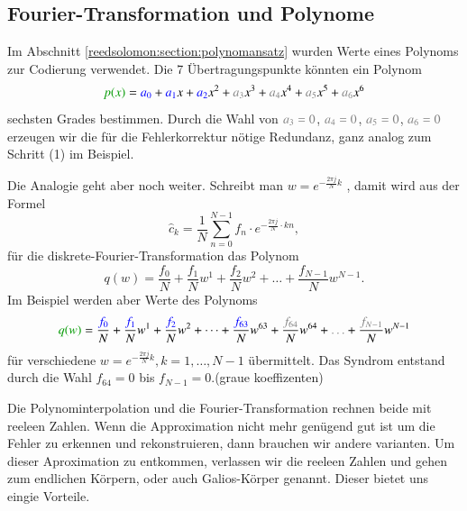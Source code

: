 \subsection{Fourier-Transformation und Polynome\label{reedsolomon:subsection:ftandpolynom}}
Im Abschnitt \ref{reedsolomon:section:polynomansatz}
wurden Werte eines Polynoms zur Codierung verwendet.
Die 7 Übertragungspunkte könnten ein Polynom
\begin{equation}
	\textcolor{darkgreen}{p(x)}
	=
	\textcolor{blue}{a_0} + \textcolor{blue}{a_1}x + \textcolor{blue}{a_2}x^2 +
	\textcolor{gray}{a_3}x^3 + \textcolor{gray}{a_4}x^4 + \textcolor{gray}{a_5}x^5 +
	\textcolor{gray}{a_6}x^6
\label{reedsolomon:equationpoly}
\end{equation}
sechsten Grades bestimmen.
Durch die Wahl von $\textcolor{gray}{a_3=0}$, $\textcolor{gray}{a_4=0}$, $\textcolor{gray}{a_5=0}$, $\textcolor{gray}{a_6=0}$ 
erzeugen wir die für die Fehlerkorrektur nötige Redundanz, ganz analog zum Schritt (1) im Beispiel.
\par 
Die Analogie geht aber noch weiter.
 Schreibt man 
 \( w =
 e^{-\frac{2\pi j}{N} k}\)
 \label{reedsolomon:DFT_summand}, damit wird aus der Formel
 \begin{equation}
	\hat{c}_{k} 
	= \frac{1}{N} \sum_{n=0}^{N-1}
	{f}_n \cdot e^{-\frac{2\pi j}{N} \cdot kn}
	,\label{reedsolomon:DFT}
 \end{equation}
 für die diskrete-Fourier-Transformation das Polynom
 \begin{equation}
	q(w)=
	\frac{{f}_0}{N} + \frac{{f}_1}{N} w^1 + \frac{{f}_2}{N} w^2 + \dots + \frac{{f}_{N-1}}{N} w^{N-1}.
	\label{reedsolomon:DFT_polynom}
 \end{equation}
 Im Beispiel werden aber Werte des Polynoms
 \begin{equation}
	\textcolor{darkgreen}{q(w)}=
	\frac{\textcolor{blue}{{f}_0}}{N} + \frac{\textcolor{blue}{{f}_1}}{N} w^1 + \frac{\textcolor{blue}{{f}_2}}{N} w^2 + \dots + 
	\frac{\textcolor{blue}{{f}_{63}}}{N} w^{63} + \frac{\textcolor{gray}{{f}_{64}}}{N} w^{64} + \textcolor{gray}{\dots} + \frac{\textcolor{gray}{{f}_{N-1}}}{N} w^{N-1}
	\label{reedsolomon:DFT_polynom2}
 \end{equation}
	für verschiedene \( w = e^{-\frac{2\pi j}{N} k}, k=1, \dots ,N-1\) übermittelt.
Das Syndrom entstand durch die Wahl ${f_{64}}=0$ bis ${f}_{N-1}=0$.(graue koeffizenten)
\par
Die Polynominterpolation und die Fourier-Transformation rechnen beide mit reeleen Zahlen.
Wenn die Approximation nicht mehr genügend gut ist um die Fehler zu erkennen und rekonstruieren,
dann brauchen wir andere varianten.
Um dieser Aproximation zu entkommen, verlassen wir die reeleen Zahlen und gehen zum endlichen Körpern, oder auch Galios-Körper genannt.
Dieser bietet uns eingie Vorteile.